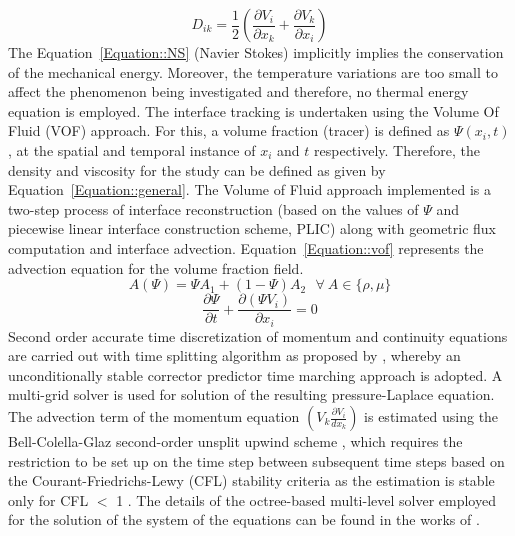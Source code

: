 \documentclass[%
aip,
sd,%
amsmath,amssymb,
preprint,%
author-year,%
]{revtex4-1}
\begin{document}
\begin{equation} \label{Equation::deformation}
D_{ik} = \frac{1}{2}\left(\frac{\partial V_i}{\partial x_k} + \frac{\partial V_k}{\partial x_i}\right)
\end{equation}
The Equation~\ref{Equation::NS} (Navier Stokes) implicitly implies the conservation of the mechanical energy. Moreover, the temperature variations are too small to affect the phenomenon being investigated and therefore, no thermal energy equation is employed. The interface tracking is undertaken using the Volume Of Fluid (VOF) approach. For this, a volume fraction (tracer) is defined as $\Psi(x_i,t)$, at the spatial and temporal instance of $x_i$ and $t$ respectively. Therefore, the density and viscosity for the study can be defined as given by Equation~\ref{Equation::general}. The Volume of Fluid approach implemented is a two-step process of interface reconstruction (based on the values of $\Psi$ and piecewise linear interface construction scheme, PLIC) along with geometric flux computation and interface advection. Equation~\ref{Equation::vof} represents the advection equation for the volume fraction field.
\begin{equation} \label{Equation::general}
A (\Psi) = \Psi A_1 + (1-\Psi)A_2 \: \: \:  \forall  \: A \in \{\rho, \mu\}
\end{equation}
\begin{equation} \label{Equation::vof}
\frac{\partial \Psi}{\partial t} + \frac{\partial(\Psi V_i)}{\partial x_i} = 0
\end{equation}
Second order accurate time discretization of momentum and continuity equations are carried out with time splitting algorithm as proposed by \cite{Chorin1968}, whereby an unconditionally stable corrector predictor time marching approach is adopted. A multi-grid solver is used for solution of the resulting pressure-Laplace equation. The advection term of the momentum equation $\left(V_k\frac{\partial V_i}{dx_k}\right)$ is estimated using the Bell-Colella-Glaz second-order unsplit upwind scheme \citep{bell1989second}, which requires the restriction to be set up on the time step between subsequent time steps based on the Courant-Friedrichs-Lewy (CFL) stability criteria as the estimation is stable only for CFL $<$ 1 \citep{popinet2009}. The details of the octree-based multi-level solver employed for the solution of the system of the equations can be found in the works of \cite{Popinet2003,popinet2009}. \\ 
\end{document}
